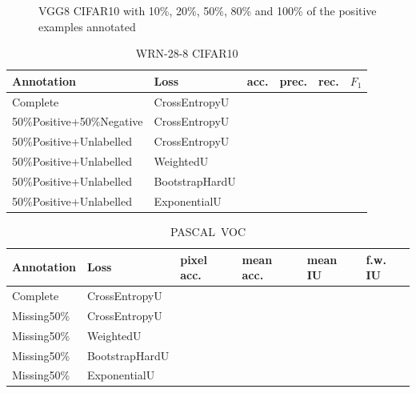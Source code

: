 \begin{figure}[t]
\begin{center}
\fbox{\rule{0pt}{2in} \rule{0.9\linewidth}{0pt}}
\end{center}
   \caption{VGG8 CIFAR10 with 10\%, 20\%, 50\%, 80\% and 100\% of the positive examples annotated}
\label{fig:percentage}
\end{figure}

\begin{table}
\begin{center}
\begin{tabular}{ll|llll}
Annotation  & Loss & acc. & prec. & rec. & $F_1$ \\
\hline
Complete    & CrossEntropyU  &  &  & & \\
50\%Positive+50\%Negative & CrossEntropyU & & & & \\
50\%Positive+Unlabelled & CrossEntropyU & & & & \\
50\%Positive+Unlabelled & WeightedU   &  &  & & \\
50\%Positive+Unlabelled & BootstrapHardU  &  &  & & \\
50\%Positive+Unlabelled & ExponentialU  &  &  & & \\
\end{tabular}
\end{center}
\caption{WRN-28-8 CIFAR10}
\end{table}


\begin{table}
\begin{center}
\begin{tabular}{ll|llll}
Annotation  & Loss & pixel acc. & mean acc. & mean IU & f.w. IU \\
\hline
Complete    & CrossEntropyU  &  &  & & \\
Missing50\% & CrossEntropyU & & & & \\
Missing50\% & WeightedU   &  &  & & \\
Missing50\% & BootstrapHardU  &  &  & & \\
Missing50\% & ExponentialU  &  &  & & \\
\end{tabular}
\end{center}
\caption{PASCAL\ VOC}
\end{table}
